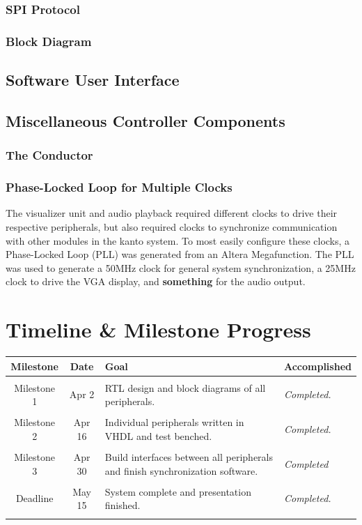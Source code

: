 \documentclass{article}
\begin{document}
	\subsubsection{SPI Protocol}
	\subsubsection{Block Diagram}
	


\subsection{Software User Interface}

\subsection{Miscellaneous Controller Components}
\subsubsection{The Conductor}
\subsubsection{Phase-Locked Loop for Multiple Clocks}
The visualizer unit and audio playback required different clocks to drive their respective peripherals, but also required clocks to synchronize communication with other modules in the kanto system. To most easily configure these clocks, a Phase-Locked Loop (PLL) was generated from an Altera Megafunction. The PLL was used to generate a 50MHz clock for general system synchronization, a 25MHz clock to drive the VGA display, and \textbf{something} for the audio output. %

\section{Timeline \& Milestone Progress}
\begin{tabular}{cc|p{7cm}p{3cm}}
\textbf{Milestone} & \textbf{Date} & \textbf{Goal} & \textbf{Accomplished}\\ \hline
&&&\\
Milestone 1 & Apr 2 & RTL design and block diagrams of all peripherals.&
	\textit{Completed.}\\
&&&\\
Milestone 2 & Apr 16 & Individual peripherals written in VHDL and test benched.&
	\textit{Completed.}\\
&&&\\
Milestone 3 & Apr 30 & Build interfaces between all peripherals and finish synchronization software. &
	\textit{Completed}\\
&&&\\
Deadline&May 15&System complete and presentation finished.&\textit{Completed.}\\
&&&\\
\end{tabular}
\end{document}
